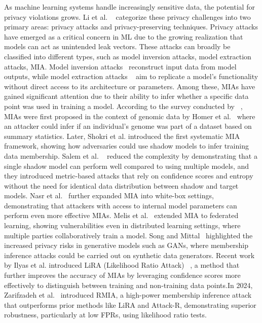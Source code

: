 As machine learning systems handle increasingly sensitive data, the potential for privacy violations grows. Li et al.    ~\cite{liu2021machine} categorize these privacy challenges into two primary areas: privacy attacks and privacy-preserving techniques. Privacy attacks have emerged as a critical concern in ML due to the growing realization that models can act as unintended leak vectors. These attacks can broadly be classified into different types, such as model inversion attacks, model extraction attacks, MIA. Model inversion attacks~\cite{fredrikson2015model} reconstruct input data from model outputs, while model extraction attacks ~\cite{juuti2019prada} aim to replicate a model’s functionality without direct access to its architecture or parameters. Among these, MIAs have gained significant attention due to their ability to infer whether a specific data point was used in training a model. According to the survey conducted by ~\cite{hu2022membership}, MIAs were first proposed in the context of genomic data by Homer et al.~\cite{homer2008resolving} where an attacker could infer if an individual's genome was part of a dataset based on summary statistics. Later, Shokri et al.\cite{shokri} introduced the first systematic MIA framework, showing how adversaries could use shadow models to infer training data membership. Salem et al. ~\cite{salem2018ml} reduced the complexity by demonstrating that a single shadow model can perform well compared to using multiple models, and they introduced metric-based attacks that rely on confidence scores and entropy without the need for identical data distribution between shadow and target models. Nasr et al.~\cite{nasr2019comprehensive} further expanded MIA into white-box settings, demonstrating that attackers with access to internal model parameters can perform even more effective MIAs. Melis et al.~\cite{melis2019exploiting} extended MIA to federated learning, showing vulnerabilities even in distributed learning settings, where multiple parties collaboratively train a model. Song and Mittal~\cite{song2021systematic} highlighted the increased privacy risks in generative models such as GANs, where membership inference attacks could be carried out on synthetic data generators. Recent work by Ilyas et al. introduced LiRA (Likelihood Ratio Attack) ~\cite{carlini2022membership}, a method that further improves the accuracy of MIAs by leveraging confidence scores more effectively to distinguish between training and non-training data points.In 2024, Zarifzadeh et al.~\cite{zarifzadeh2024low} introduced RMIA, a high-power membership inference attack that outperforms prior methods like LiRA and Attack-R, demonstrating superior robustness, particularly at low FPRs, using likelihood ratio tests.
